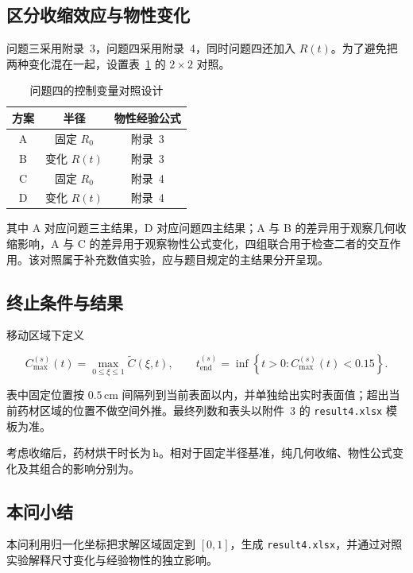\subsection{区分收缩效应与物性变化}

问题三采用附录~3，问题四采用附录~4，同时问题四还加入 $R(t)$。为了避免把两种变化混在一起，设置表~\ref{tab:q4-controls} 的 $2\times2$ 对照。

\begin{table}[H]
  \centering
  \caption{问题四的控制变量对照设计}
  \label{tab:q4-controls}
  \begin{tabular}{ccc}
    \toprule
    方案 & 半径 & 物性经验公式 \\
    \midrule
    A & 固定 $R_0$ & 附录~3 \\
    B & 变化 $R(t)$ & 附录~3 \\
    C & 固定 $R_0$ & 附录~4 \\
    D & 变化 $R(t)$ & 附录~4 \\
    \bottomrule
  \end{tabular}
\end{table}

其中 A 对应问题三主结果，D 对应问题四主结果；A 与 B 的差异用于观察几何收缩影响，A 与 C 的差异用于观察物性公式变化，四组联合用于检查二者的交互作用。该对照属于补充数值实验，应与题目规定的主结果分开呈现。

\subsection{终止条件与结果}

移动区域下定义

\begin{equation}
  C_{\max}^{(s)}(t)=\max_{0\le \xi\le1}\widetilde C(\xi,t),
  \qquad
  t_{\mathrm{end}}^{(s)}=\inf\left\{t>0:C_{\max}^{(s)}(t)<0.15\right\}.
  \label{eq:q4-end-time}
\end{equation}



表中固定位置按 $0.5\,\mathrm{cm}$ 间隔列到当前表面以内，并单独给出实时表面值；超出当前药材区域的位置不做空间外推。最终列数和表头以附件~3 的 \texttt{result4.xlsx} 模板为准。


考虑收缩后，药材烘干时长为\,h。相对于固定半径基准，纯几何收缩、物性公式变化及其组合的影响分别为。


\subsection{本问小结}

本问利用归一化坐标把求解区域固定到 $[0,1]$，生成 \texttt{result4.xlsx}，并通过对照实验解释尺寸变化与经验物性的独立影响。
